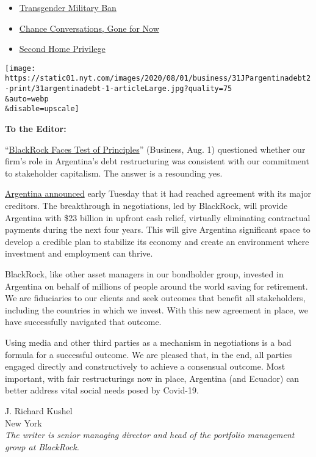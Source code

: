 \begin{itemize}
\tightlist
\item
  \protect\hyperlink{link-41dc3ccd}{Transgender Military Ban}
\item
  \protect\hyperlink{link-39030f85}{Chance Conversations, Gone for Now}
\item
  \protect\hyperlink{link-7febb0b}{Second Home Privilege}
\end{itemize}

\texttt{[image: https://static01.nyt.com/images/2020/08/01/business/31JPargentinadebt2-print/31argentinadebt-1-articleLarge.jpg?quality=75\\\&auto=webp\\\&disable=upscale]}

\textbf{To the Editor:}

``\href{https://www.nytimes.com/2020/07/31/business/argentina-debt.html}{BlackRock
Faces Test of Principles}'' (Business, Aug. 1) questioned whether our
firm's role in Argentina's debt restructuring was consistent with our
commitment to stakeholder capitalism. The answer is a resounding yes.

\href{https://www.economia.gob.ar/en/argentina-and-three-creditor-groups-reach-a-deal-on-debt-restructuring/}{Argentina
announced} early Tuesday that it had reached agreement with its major
creditors. The breakthrough in negotiations, led by BlackRock, will
provide Argentina with \$23 billion in upfront cash relief, virtually
eliminating contractual payments during the next four years. This will
give Argentina significant space to develop a credible plan to stabilize
its economy and create an environment where investment and employment
can thrive.

BlackRock, like other asset managers in our bondholder group, invested
in Argentina on behalf of millions of people around the world saving for
retirement. We are fiduciaries to our clients and seek outcomes that
benefit all stakeholders, including the countries in which we invest.
With this new agreement in place, we have successfully navigated that
outcome.

Using media and other third parties as a mechanism in negotiations is a
bad formula for a successful outcome. We are pleased that, in the end,
all parties engaged directly and constructively to achieve a consensual
outcome. Most important, with fair restructurings now in place,
Argentina (and Ecuador) can better address vital social needs posed by
Covid-19.

J. Richard Kushel\\
New York\\
\emph{The writer is senior managing director and head of the portfolio
management group at BlackRock.}

